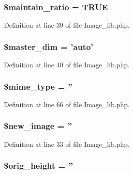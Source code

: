 \subsubsection[{\$maintain\-\_\-ratio}]{\setlength{\rightskip}{0pt plus 5cm}\$maintain\-\_\-ratio = T\-R\-U\-E}\label{class_c_i___image__lib_a7fe1beb3e7d60245c97c60ee4b668d93}


Definition at line 39 of file Image\-\_\-lib.\-php.

\subsubsection[{\$master\-\_\-dim}]{\setlength{\rightskip}{0pt plus 5cm}\$master\-\_\-dim = 'auto'}\label{class_c_i___image__lib_ae86c3d7ce316cc0c48a8dcba8ae4130d}


Definition at line 40 of file Image\-\_\-lib.\-php.

\subsubsection[{\$mime\-\_\-type}]{\setlength{\rightskip}{0pt plus 5cm}\$mime\-\_\-type = ''}\label{class_c_i___image__lib_a4d1985caafb49b059e3ca3dedfee257a}


Definition at line 66 of file Image\-\_\-lib.\-php.

\subsubsection[{\$new\-\_\-image}]{\setlength{\rightskip}{0pt plus 5cm}\$new\-\_\-image = ''}\label{class_c_i___image__lib_a6147ac30032312f2b42a9b05618faf12}


Definition at line 33 of file Image\-\_\-lib.\-php.

\subsubsection[{\$orig\-\_\-height}]{\setlength{\rightskip}{0pt plus 5cm}\$orig\-\_\-height = ''}\label{class_c_i___image__lib_a68713f45d7d236dfdd6aafdc9668a44d}


